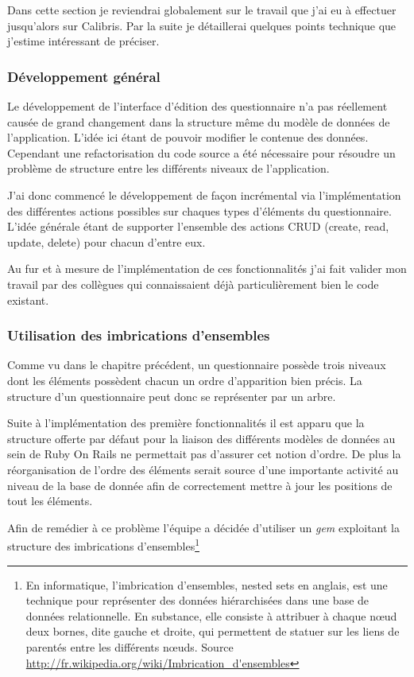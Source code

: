 \documentclass[12pt,a4paper]{book}
\begin{document}
Dans cette section je reviendrai globalement sur le travail que j'ai eu à effectuer jusqu'alors sur Calibris. Par la suite je détaillerai quelques points technique que j'estime intéressant de préciser.

\subsubsection{Développement général}

Le développement de l'interface d'édition des questionnaire n'a pas réellement causée de grand changement dans la structure même du modèle de données de l'application. L'idée ici étant de pouvoir modifier le contenue des données. Cependant une refactorisation du code source a été nécessaire pour résoudre un problème de structure entre les différents niveaux de l'application.

J'ai donc commencé le développement de façon incrémental via l'implémentation des différentes actions possibles sur chaques types d'éléments du questionnaire. L'idée générale étant de supporter l'ensemble des actions CRUD (create, read, update, delete) pour chacun d'entre eux.

Au fur et à mesure de l'implémentation de ces fonctionnalités j'ai fait valider mon travail par des collègues qui connaissaient déjà particulièrement bien le code existant.

\subsubsection{Utilisation des imbrications d'ensembles}
\label{section.ans}

Comme vu dans le chapitre précédent, un questionnaire possède trois niveaux dont les éléments possèdent chacun un ordre d'apparition bien précis. La structure d'un questionnaire peut donc se représenter par un arbre.

Suite à l'implémentation des première fonctionnalités il est apparu que la structure offerte par défaut pour la liaison des différents modèles de données au sein de Ruby On Rails ne permettait pas d'assurer cet notion d'ordre. De plus la réorganisation de l'ordre des éléments serait source d'une importante activité au niveau de la base de donnée afin de correctement mettre à jour les positions de tout les éléments.

Afin de remédier à ce problème l'équipe a décidée d'utiliser un \textit{gem} exploitant la structure des imbrications d'ensembles\footnote{En informatique, l'imbrication d'ensembles, nested sets en anglais, est une technique pour représenter des données hiérarchisées dans une base de données relationnelle. En substance, elle consiste à attribuer à chaque nœud deux bornes, dite gauche et droite, qui permettent de statuer sur les liens de parentés entre les différents nœuds. Source \url{http://fr.wikipedia.org/wiki/Imbrication_d'ensembles}}
\end{document}
